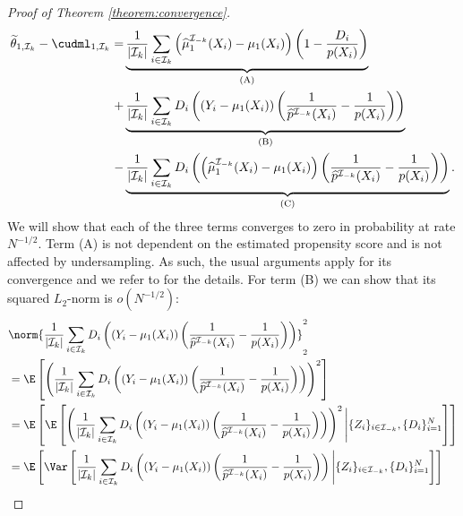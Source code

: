 \begin{appendix}
\begin{proof}[Proof of Theorem \ref{theorem:convergence}]
    \begin{align*}
        \widetilde{\theta}_{1,\mathcal{I}_k} - \cudml_{1,\mathcal{I}_k} = &\underbrace{\frac{1}{\vert \mathcal{I}_k \vert} \sum_{i\in\mathcal{I}_k}  \left( \widehat\mu^{\mathcal{I}_{-k}}_1(X_i) - \mu_1(X_i) \right)\left(1-\frac{D_i}{p(X_i)} \right)}_{\text{(A)}}\\
        +& \underbrace{\frac{1}{\vert \mathcal{I}_k \vert} \sum_{i\in\mathcal{I}_k} D_i \left(\left(Y_i - \mu_1(X_i)\right) \left( \frac{1}{\widehat{p}^{\mathcal{I}_{-k}}(X_i)} - \frac{1}{p(X_i)}\right) \right)}_{\text{(B)}}\\
        -& \underbrace{\frac{1}{\vert \mathcal{I}_k \vert} \sum_{i\in\mathcal{I}_k} D_i \left(\left(\widehat\mu^{\mathcal{I}_{-k}}_1(X_i)  - \mu_1(X_i)\right) \left( \frac{1}{\widehat{p}^{\mathcal{I}_{-k}}(X_i)} - \frac{1}{p(X_i)}\right) \right)}_{\text{(C)}}.
    \end{align*}
    We will show that each of the three terms converges to zero in probability at rate $N^{-1/2}$. Term (A) is not dependent on the estimated propensity score and is not affected by undersampling. As such, the usual arguments apply for its convergence and we refer to \cite{Wager2022} for the details. For term (B) we can show that its squared $L_2$-norm is $o\left(N^{-1/2}\right)$:
    \begin{align}\label{eq:l2_B}
        \begin{split}
            &\norm{\frac{1}{\vert \mathcal{I}_k \vert} \sum_{i\in\mathcal{I}_k} D_i \left(\left(Y_i - \mu_1(X_i)\right) \left( \frac{1}{\widehat{p}^{\mathcal{I}_{-k}}(X_i)} - \frac{1}{p(X_i)}\right) \right)}_2^2\\ 
            &= \E\left[\left(\frac{1}{\vert \mathcal{I}_k \vert} \sum_{i\in\mathcal{I}_k} D_i \left(\left(Y_i - \mu_1(X_i)\right) \left( \frac{1}{\widehat{p}^{\mathcal{I}_{-k}}(X_i)} - \frac{1}{p(X_i)}\right) \right) \right)^2 \right]\\
            &= \E\left[ \E\left[\left(\frac{1}{\vert \mathcal{I}_k \vert} \sum_{i\in\mathcal{I}_k} D_i \left(\left(Y_i - \mu_1(X_i)\right) \left( \frac{1}{\widehat{p}^{\mathcal{I}_{-k}}(X_i)} - \frac{1}{p(X_i)}\right) \right) \right)^2  \Bigg\vert \{Z_i\}_{i\in \mathcal{I}_{-k}},  \{D_i\}_{i=1}^N \right]\right]\\
            &= \E\left[ \Var\left[\frac{1}{\vert \mathcal{I}_k \vert} \sum_{i\in\mathcal{I}_k} D_i \left(\left(Y_i - \mu_1(X_i)\right) \left( \frac{1}{\widehat{p}^{\mathcal{I}_{-k}}(X_i)} - \frac{1}{p(X_i)}\right) \right)  \Bigg\vert \{Z_i\}_{i\in \mathcal{I}_{-k}},  \{D_i\}_{i=1}^N \right]\right]\\

\end{split}
\end{align}
\end{proof}
\end{appendix}
